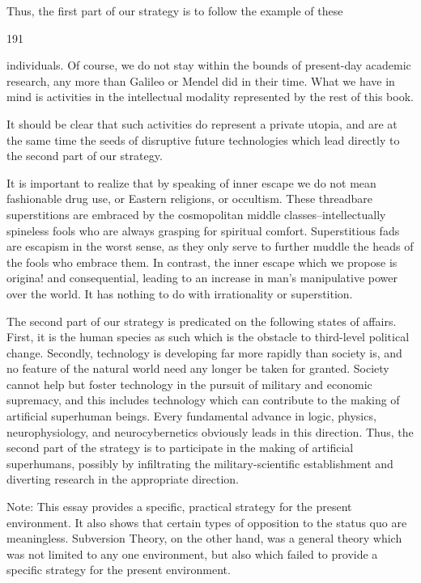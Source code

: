 \documentclass[10pt,twoside]{memoir}
\begin{document}
\begin{enumerate}
{{{{Thus, the first part of our strategy is to follow the example of these 


191 


individuals. Of course, we do not stay within the bounds of present-day 
academic research, any more than Galileo or Mendel did in their time. What 
we have in mind is activities in the intellectual modality represented by the 
rest of this book. 

It should be clear that such activities do represent a private utopia, and are at 
the same time the seeds of disruptive future technologies which lead directly 
to the second part of our strategy. 


It is important to realize that by speaking of inner escape we do not 
mean fashionable drug use, or Eastern religions, or occultism. These 
threadbare superstitions are embraced by the cosmopolitan middle 
classes--intellectually spineless fools who are always grasping for spiritual 
comfort. Superstitious fads are escapism in the worst sense, as they only 
serve to further muddle the heads of the fools who embrace them. In 
contrast, the inner escape which we propose is origina! and consequential, 
leading to an increase in man's manipulative power over the world. It has 
nothing to do with irrationality or superstition. 

The second part of our strategy is predicated on the following states of 
affairs. First, it is the human species as such which is the obstacle to 
third-level political change. Secondly, technology is developing far more 
rapidly than society is, and no feature of the natural world need any longer 
be taken for granted. Society cannot help but foster technology in the 
pursuit of military and economic supremacy, and this includes technology 
which can contribute to the making of artificial superhuman beings. Every 
fundamental advance in logic, physics, neurophysiology, and 
neurocybernetics obviously leads in this direction. Thus, the second part of 
the strategy is to participate in the making of artificial superhumans, 
possibly by infiltrating the military-scientific establishment and diverting 
research in the appropriate direction. 


Note: This essay provides a specific, practical strategy for the present 
environment. It also shows that certain types of opposition to the status quo 
are meaningless. Subversion Theory, on the other hand, was a general theory 
which was not limited to any one environment, but also which failed to 
provide a specific strategy for the present environment. 


}}}}
\end{enumerate}
\end{document}
